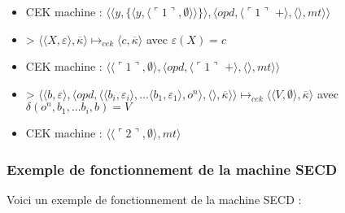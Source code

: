 \documentclass[10pt,a4paper]{article}
\begin{document}
\begin{itemize}
						\item[] CEK machine : $\langle\langle y,\{\langle y,\langle\ulcorner 1\urcorner,\emptyset\rangle\rangle\}\rangle,\langle opd,\langle\ulcorner 1\urcorner$ $+\rangle,\langle\rangle,mt\rangle\rangle$
						\item[] > $\langle\langle X,\varepsilon\rangle,\overline{\kappa}\rangle \longmapsto_{cek} \langle c,\overline{\kappa}\rangle$ avec $\varepsilon(X) = c$
						\item[] CEK machine : $\langle\langle\ulcorner 1\urcorner,\emptyset\rangle,\langle opd,\langle\ulcorner 1\urcorner$ $+\rangle,\langle\rangle,mt\rangle\rangle$
						\item[] > $\langle  \langle b,\varepsilon\rangle,\langle opd,\langle \langle b_{i},\varepsilon_{i}\rangle,...\langle b_{1},\varepsilon_{1}\rangle ,o^{n}\rangle,\langle\rangle,\overline{\kappa}\rangle\rangle \longmapsto_{cek} \langle \langle V,\emptyset\rangle,\overline{\kappa}\rangle$ avec $\delta(o^{n},b_{1},...b_{i},b) = V$
						\item[] CEK machine : $\langle\langle\ulcorner 2\urcorner,\emptyset\rangle,mt\rangle$
					\end{itemize}
				\newpage
				
				\subsubsection{Exemple de fonctionnement de la machine SECD}\label{SECD}
				
					Voici un exemple de fonctionnement de la machine SECD :	
					
\end{document}
